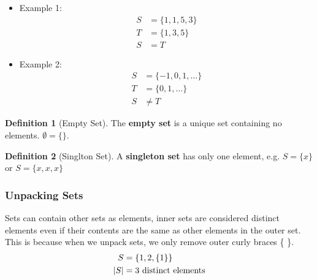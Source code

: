 \documentclass[12pt]{article}
\DeclarePairedDelimiter\abs{\lvert}{\rvert}
\theoremstyle{definition}
\newtheorem{definition}{Definition}
\begin{document}
        \begin{itemize}
            \item Example 1: \\
            \begin{align*}
                S &= \{1,1,5,3\} \\
                T &= \{1,3,5\} \\
                S &= T
            \end{align*}
            \item Example 2:
            \begin{align*}
                S &= \{-1, 0, 1, \dots\} \\
                T &= \{0, 1, \dots\} \\
                S &\neq T
            \end{align*}
        \end{itemize}

        \begin{definition}[Empty Set]
            \label{def:empty-set}
            The \textbf{empty set} is a unique set containing no elements. $\emptyset = \{\}$.\\
        \end{definition}
        \begin{definition}[Singlton Set]
            \label{def:singleton-set}
            A \textbf{singleton set} has only one element, e.g. $S = \{x\}$ or $S = \{x, x, x\}$
        \end{definition}

        \subsubsection{Unpacking Sets}
        Sets can contain other sets as elements, inner sets are considered distinct elements even if 
        their contents are the same as other elements in the outer set. This is because when we unpack sets,
        we only remove outer curly braces \{ \}.
        \begin{align*}
            S &= \{1, 2, \{1\} \} \\
            \abs{S} &= 3 \text{ distinct elements}
        \end{align*}
\end{document}
